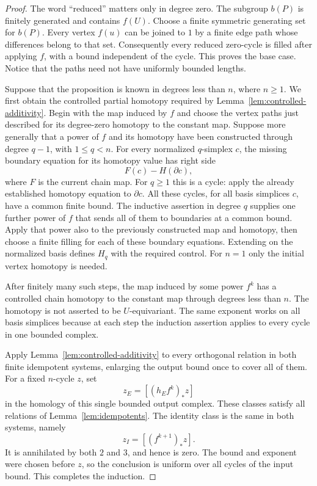 \begin{proof}
The word ``reduced'' matters only in degree zero.  The subgroup
$b(P)$ is finitely generated and contains $f(U)$.  Choose a finite
symmetric generating set for $b(P)$.  Every vertex $f(u)$ can be
joined to $1$ by a finite edge path whose differences belong to that
set.  Consequently every reduced zero-cycle is filled after applying
$f$, with a bound independent of the cycle.  This proves the base
case.  Notice that the paths need not have uniformly bounded lengths.

Suppose that the proposition is known in degrees less than $n$,
where $n\ge1$.  We first obtain the controlled partial homotopy
required by Lemma~\ref{lem:controlled-additivity}.  Begin with the
map induced by $f$ and choose the vertex paths just described for
its degree-zero homotopy to the constant map.  Suppose more generally
that a power of $f$ and its homotopy have been constructed through
degree $q-1$, with $1\le q<n$.  For every normalized $q$-simplex $c$, the
missing boundary equation for its homotopy value has right side
\[
 F(c)-H(\partial c),
\]
where $F$ is the current chain map.  For $q\ge1$ this is a cycle:
apply the already established homotopy equation to $\partial c$.
All these cycles, for all basis simplices $c$, have a common finite
bound.  The inductive assertion in degree $q$ supplies one further
power of $f$ that sends all of them to boundaries at a common bound.
Apply that power also to the previously constructed map and homotopy,
then choose a finite filling for each of these boundary equations.
Extending on the normalized basis defines $H_q$ with the required
control.  For $n=1$ only the initial vertex homotopy is needed.

After finitely many such steps, the map induced by some power $f^k$
has a controlled chain homotopy to the constant map through degrees
less than $n$.
The homotopy is not asserted to be $U$-equivariant.  The same exponent
works on all basis simplices because at each step the induction
assertion applies to every cycle in one bounded complex.

Apply Lemma~\ref{lem:controlled-additivity} to every orthogonal
relation in both finite idempotent systems, enlarging the output
bound once to cover all of them.  For a fixed $n$-cycle $z$, set
\[
 z_E=[(h_Ef^k)_*z]
\]
in the homology of this single bounded output complex.  These classes
satisfy all relations of Lemma~\ref{lem:idempotents}.  The identity
class is the same in both systems, namely
\[
 z_I=[(f^{k+1})_*z].
\]
It is annihilated by both $2$ and $3$, and hence is zero.  The bound
and exponent were chosen before $z$, so the conclusion is uniform
over all cycles of the input bound.  This completes the induction.
\end{proof}

